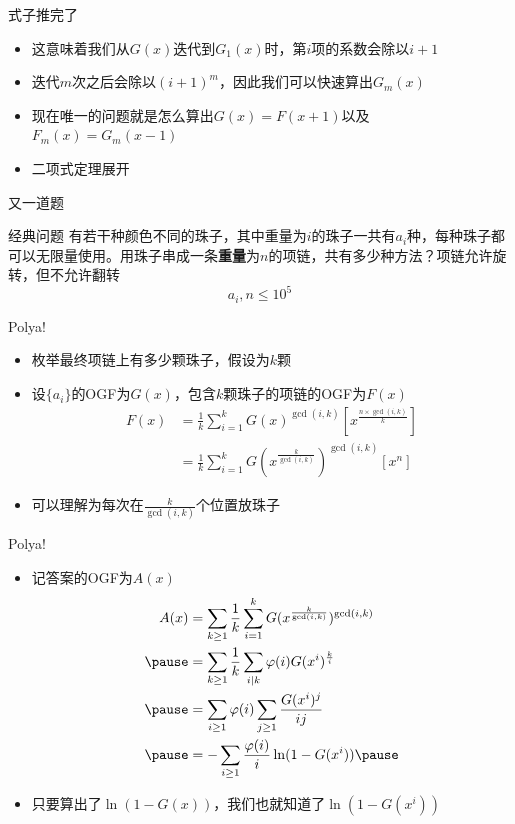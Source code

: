 \documentclass{beamer}
\begin{document}
\begin{frame}{式子推完了}
    \begin{itemize}
        \item 这意味着我们从$G(x)$迭代到$G_1(x)$时，第$i$项的系数会除以$i + 1$ 
        \item 迭代$m$次之后会除以$(i + 1)^m$，因此我们可以快速算出$G_m(x)$ \pause
        \item 现在唯一的问题就是怎么算出$G(x) = F(x + 1)$以及$F_m(x) = G_m(x - 1)$ \pause
        \item 二项式定理展开 \pause
    \end{itemize}
\end{frame}

\begin{frame}{又一道题}
    \begin{block}{经典问题}
        有若干种颜色不同的珠子，其中重量为$i$的珠子一共有$a_i$种，每种珠子都可以无限量使用。用珠子串成一条\textbf{重量}为$n$的项链，共有多少种方法？项链允许旋转，但不允许翻转
        $$a_i, n\leq 10^5$$
    \end{block}
\end{frame}

\begin{frame}{Polya!}
    \begin{itemize}
        \item 枚举最终项链上有多少颗珠子，假设为$k$颗 \pause
        \item 设$\{a_i\}$的OGF为$G(x)$，包含$k$颗珠子的项链的OGF为$F(x)$ \pause
        $$\begin{aligned}
            F(x) &= \frac{1}{k}\sum_{i = 1}^kG(x)^{\gcd(i, k)}[x^{\frac{n\times \gcd(i, k)}{k}}]\\
            &= \frac{1}{k}\sum_{i = 1}^kG(x^{\frac{k}{\gcd(i, k)}})^{\gcd(i, k)}[x^n]
        \end{aligned}$$
        \item 可以理解为每次在$\frac{k}{\gcd(i, k)}$个位置放珠子
    \end{itemize}
\end{frame}

\begin{frame}{Polya!}
    \begin{itemize}
        \item 记答案的OGF为$A(x)$ \pause
        $$\begin{aligned}
            A(x)&=\sum_{k\geq 1}\frac{1}{k}\sum_{i=1}^kG(x^{\frac{k}{\gcd(i,k)}})^{\gcd(i,k)}\\ \pause
                &=\sum_{k\geq 1}\frac{1}{k}\sum_{i|k}\varphi(i)G(x^i)^\frac{k}{i}\\ \pause
                &=\sum_{i\geq 1}\varphi(i)\sum_{j\geq 1}\frac{G(x^i)^j}{ij}\\ \pause
                &=-\sum_{i\geq 1}\frac{\varphi(i)}{i}\ln(1-G(x^i)) \pause
        \end{aligned}$$
        \item 只要算出了$\ln(1 - G(x))$，我们也就知道了$\ln(1 - G(x^i))$
    \end{itemize}
\end{frame}
\end{document}
